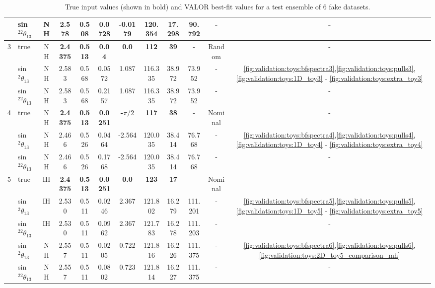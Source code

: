 \begin{table}[htb]
\begin{center}
\begin{tabular}{@{}| c | l | c | c  c  c  c| c  c  | c | c | c |@{}}
& sin$^22\theta_{13}$  & NH  & 2.578          & 0.508      & 0.0728      & -0.0179   & 120.354    & 17.298   & 90.792  & - & - \\
\hline
3  & true  & NH & {\bf 2.4375 }   & {\bf 0.513}   & {\bf 0.04}   & {\bf 0.0} & {\bf 112}   & {\bf 39}   &  - & Random & - \\
   & sin$^2\theta_{13}$  & NH  & 2.583          & 0.568      & 0.0572      & 1.087   & 116.335    & 38.972   & 73.952  & - &  \ref{fig:validation:toys:bfspectra3},\ref{fig:validation:toys:pulls3}, \ref{fig:validation:toys:1D_toy3} - \ref{fig:validation:toys:extra_toy3} \\
& sin$^22\theta_{13}$  & NH  & 2.583          & 0.568      & 0.2157      & 1.087   & 116.335    & 38.972   & 73.952  & - &  - \\
\hline
4  & true  & NH & {\bf 2.4375 }   & {\bf 0.513}   & {\bf 0.0251}   & {\bf -$\pi/2$} & {\bf 117}   & {\bf 38}   &  - & Nominal & - \\
   & sin$^2\theta_{13}$  & NH  & 2.466          & 0.526      & 0.0464      & -2.564   & 120.035    & 38.414   & 76.768  & - &  \ref{fig:validation:toys:bfspectra4},\ref{fig:validation:toys:pulls4}, \ref{fig:validation:toys:1D_toy4} - \ref{fig:validation:toys:extra_toy4} \\
& sin$^22\theta_{13}$  & NH  & 2.466          & 0.526      & 0.1768      & -2.564   & 120.035    & 38.414  & 76.768  & - &  - \\
\hline
5 & true  & IH & {\bf 2.4375 }   & {\bf 0.513}   & {\bf 0.0251}   & {\bf 0.0} & {\bf 123}   & {\bf 17}   &  - & Nominal & - \\
   & sin$^2\theta_{13}$  & IH  & 2.530          & 0.511      & 0.0246      & 2.367   & 121.802    & 16.279   & 111.201  & - &  \ref{fig:validation:toys:bfspectra5},\ref{fig:validation:toys:pulls5}, \ref{fig:validation:toys:1D_toy5} - \ref{fig:validation:toys:extra_toy5} \\
 & sin$^22\theta_{13}$  & IH  & 2.530          & 0.511      & 0.0962      & 2.367   & 121.783    & 16.278   & 111.203  & - & - \\
   & sin$^2\theta_{13}$ & NH  & 2.557          & 0.511      & 0.0205      & 0.722   & 121.816    & 16.226   & 111.375  & - &  \ref{fig:validation:toys:bfspectra6},\ref{fig:validation:toys:pulls6}, \ref{fig:validation:toys:2D_toy5_comparison_mh}\\
& sin$^22\theta_{13}$ & NH  & 2.557          & 0.511      & 0.0802      & 0.723   & 121.814   & 16.227   & 111.375  & - &  - \\
\hline
\end{tabular}
\caption{
  True input values (shown in bold) and VALOR best-fit values for a test ensemble of 6 fake datasets. 
}
\label{tab:validation:toys}
\end{center}
\end{table}


